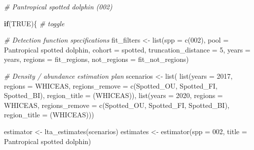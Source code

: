 \documentclass[
]{book}
\newenvironment{Shaded}{\begin{snugshade}}{\end{snugshade}}
\newcommand{\AttributeTok}[1]{\textcolor[rgb]{0.77,0.63,0.00}{#1}}
\newcommand{\CommentTok}[1]{\textcolor[rgb]{0.56,0.35,0.01}{\textit{#1}}}
\newcommand{\ConstantTok}[1]{\textcolor[rgb]{0.00,0.00,0.00}{#1}}
\newcommand{\ControlFlowTok}[1]{\textcolor[rgb]{0.13,0.29,0.53}{\textbf{#1}}}
\newcommand{\DecValTok}[1]{\textcolor[rgb]{0.00,0.00,0.81}{#1}}
\newcommand{\FunctionTok}[1]{\textcolor[rgb]{0.00,0.00,0.00}{#1}}
\newcommand{\NormalTok}[1]{#1}
\newcommand{\OtherTok}[1]{\textcolor[rgb]{0.56,0.35,0.01}{#1}}
\newcommand{\StringTok}[1]{\textcolor[rgb]{0.31,0.60,0.02}{#1}}
\begin{document}
\begin{Shaded}
\begin{Highlighting}[]
\CommentTok{\# Pantropical spotted dolphin (002)}

\ControlFlowTok{if}\NormalTok{(}\ConstantTok{TRUE}\NormalTok{)\{ }\CommentTok{\# toggle}

  \CommentTok{\# Detection function specifications}
\NormalTok{  fit\_filters }\OtherTok{\textless{}{-}}
    \FunctionTok{list}\NormalTok{(}\AttributeTok{spp =} \FunctionTok{c}\NormalTok{(}\StringTok{\textquotesingle{}002\textquotesingle{}}\NormalTok{),}
         \AttributeTok{pool =} \StringTok{\textquotesingle{}Pantropical spotted dolphin\textquotesingle{}}\NormalTok{,}
         \AttributeTok{cohort =} \StringTok{\textquotesingle{}spotted\textquotesingle{}}\NormalTok{,}
         \AttributeTok{truncation\_distance =} \DecValTok{5}\NormalTok{,}
         \AttributeTok{years =}\NormalTok{ years,}
         \AttributeTok{regions =}\NormalTok{ fit\_regions,}
         \AttributeTok{not\_regions =}\NormalTok{ fit\_not\_regions)}

  \CommentTok{\# Density / abundance estimation plan}
\NormalTok{  scenarios }\OtherTok{\textless{}{-}} \FunctionTok{list}\NormalTok{(}
    \FunctionTok{list}\NormalTok{(}\AttributeTok{years =} \DecValTok{2017}\NormalTok{,}
       \AttributeTok{regions =} \StringTok{\textquotesingle{}WHICEAS\textquotesingle{}}\NormalTok{,}
       \AttributeTok{regions\_remove =} \FunctionTok{c}\NormalTok{(}\StringTok{\textquotesingle{}Spotted\_OU\textquotesingle{}}\NormalTok{, }\StringTok{\textquotesingle{}Spotted\_FI\textquotesingle{}}\NormalTok{, }\StringTok{\textquotesingle{}Spotted\_BI\textquotesingle{}}\NormalTok{),}
       \AttributeTok{region\_title =} \StringTok{\textquotesingle{}(WHICEAS)\textquotesingle{}}\NormalTok{),}
    \FunctionTok{list}\NormalTok{(}\AttributeTok{years =} \DecValTok{2020}\NormalTok{,}
       \AttributeTok{regions =} \StringTok{\textquotesingle{}WHICEAS\textquotesingle{}}\NormalTok{,}
       \AttributeTok{regions\_remove =} \FunctionTok{c}\NormalTok{(}\StringTok{\textquotesingle{}Spotted\_OU\textquotesingle{}}\NormalTok{, }\StringTok{\textquotesingle{}Spotted\_FI\textquotesingle{}}\NormalTok{, }\StringTok{\textquotesingle{}Spotted\_BI\textquotesingle{}}\NormalTok{),}
       \AttributeTok{region\_title =} \StringTok{\textquotesingle{}(WHICEAS)\textquotesingle{}}\NormalTok{))}
  
\NormalTok{  estimator }\OtherTok{\textless{}{-}} \FunctionTok{lta\_estimates}\NormalTok{(scenarios)}
\NormalTok{  estimates }\OtherTok{\textless{}{-}} \FunctionTok{estimator}\NormalTok{(}\AttributeTok{spp =} \StringTok{\textquotesingle{}002\textquotesingle{}}\NormalTok{, }\AttributeTok{title =} \StringTok{\textquotesingle{}Pantropical spotted dolphin\textquotesingle{}}\NormalTok{)}
  

\end{Highlighting}
\end{Shaded}
\end{document}
